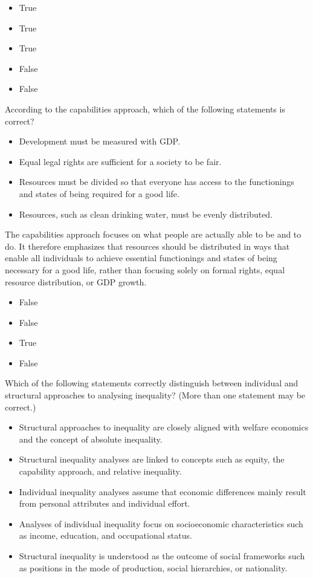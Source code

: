 \documentclass[
  a4paper,
  DIV=11,
  numbers=noendperiod,
  oneside,
  openany]{scrreprt}
\providecommand{\tightlist}{%
  \setlength{\itemsep}{0pt}\setlength{\parskip}{0pt}}
\begin{document}
\begin{itemize}
\tightlist
\item
  True
\item
  True
\item
  True
\item
  False
\item
  False
\end{itemize}

According to the capabilities approach, which of the following
statements is correct?

\begin{itemize}
\tightlist
\item[$\square$]
  Development must be measured with GDP.
\item[$\square$]
  Equal legal rights are sufficient for a society to be fair.
\item[$\square$]
  Resources must be divided so that everyone has access to the
  functionings and states of being required for a good life.
\item[$\square$]
  Resources, such as clean drinking water, must be evenly distributed.
\end{itemize}

The capabilities approach focuses on what people are actually able to be
and to do. It therefore emphasizes that resources should be distributed
in ways that enable all individuals to achieve essential functionings
and states of being necessary for a good life, rather than focusing
solely on formal rights, equal resource distribution, or GDP growth.

\begin{itemize}
\tightlist
\item
  False
\item
  False
\item
  True
\item
  False
\end{itemize}

Which of the following statements correctly distinguish between
individual and structural approaches to analysing inequality? (More than
one statement may be correct.)

\begin{itemize}
\tightlist
\item[$\square$]
  Structural approaches to inequality are closely aligned with welfare
  economics and the concept of absolute inequality.
\item[$\square$]
  Structural inequality analyses are linked to concepts such as equity,
  the capability approach, and relative inequality.
\item[$\square$]
  Individual inequality analyses assume that economic differences mainly
  result from personal attributes and individual effort.
\item[$\square$]
  Analyses of individual inequality focus on socioeconomic
  characteristics such as income, education, and occupational status.
\item[$\square$]
  Structural inequality is understood as the outcome of social
  frameworks such as positions in the mode of production, social
  hierarchies, or nationality.
\end{itemize}
\end{document}

